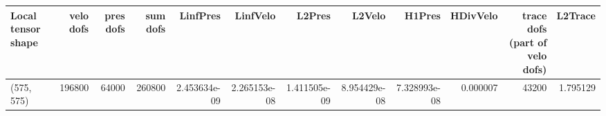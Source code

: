 \begin{tabular}{lrrrrrrrrrrr}
\toprule
Local tensor shape &  velo dofs &  pres dofs &  sum dofs &     LinfPres &     LinfVelo &       L2Pres &       L2Velo &       H1Pres &  HDivVelo &  trace dofs (part of velo dofs) &  L2Trace \\
\midrule
        (575, 575) &     196800 &      64000 &    260800 & 2.453634e-09 & 2.265153e-08 & 1.411505e-09 & 8.954429e-08 & 7.328993e-08 &  0.000007 &                           43200 & 1.795129 \\
\bottomrule
\end{tabular}
